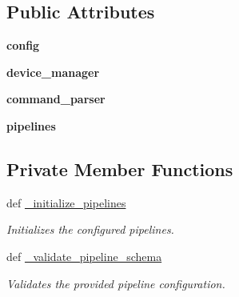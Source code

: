 \subsection*{Public Attributes}
\begin{DoxyCompactItemize}
\item 
\hypertarget{classhwm_1_1hardware_1_1pipelines_1_1manager_1_1_pipeline_manager_a11e66d6149717d994105088073f3233b}{{\bfseries config}}\label{classhwm_1_1hardware_1_1pipelines_1_1manager_1_1_pipeline_manager_a11e66d6149717d994105088073f3233b}

\item 
\hypertarget{classhwm_1_1hardware_1_1pipelines_1_1manager_1_1_pipeline_manager_a8aa2912c371eb0cc95d127b15b8164aa}{{\bfseries device\-\_\-manager}}\label{classhwm_1_1hardware_1_1pipelines_1_1manager_1_1_pipeline_manager_a8aa2912c371eb0cc95d127b15b8164aa}

\item 
\hypertarget{classhwm_1_1hardware_1_1pipelines_1_1manager_1_1_pipeline_manager_a108ced2236088b116828b55fb7a0d98d}{{\bfseries command\-\_\-parser}}\label{classhwm_1_1hardware_1_1pipelines_1_1manager_1_1_pipeline_manager_a108ced2236088b116828b55fb7a0d98d}

\item 
\hypertarget{classhwm_1_1hardware_1_1pipelines_1_1manager_1_1_pipeline_manager_a3984be455a8589fa8cc5ec28cb2ffb80}{{\bfseries pipelines}}\label{classhwm_1_1hardware_1_1pipelines_1_1manager_1_1_pipeline_manager_a3984be455a8589fa8cc5ec28cb2ffb80}

\end{DoxyCompactItemize}
\subsection*{Private Member Functions}
\begin{DoxyCompactItemize}
\item 
def \hyperlink{classhwm_1_1hardware_1_1pipelines_1_1manager_1_1_pipeline_manager_a19b0c2d59d9b7168523647ef3dffe5ad}{\-\_\-initialize\-\_\-pipelines}
\begin{DoxyCompactList}\small\item\em Initializes the configured pipelines. \end{DoxyCompactList}\item 
def \hyperlink{classhwm_1_1hardware_1_1pipelines_1_1manager_1_1_pipeline_manager_a30049fcecdad73fd9dcb18c216506fc7}{\-\_\-validate\-\_\-pipeline\-\_\-schema}
\begin{DoxyCompactList}\small\item\em Validates the provided pipeline configuration. \end{DoxyCompactList}\end{DoxyCompactItemize}


